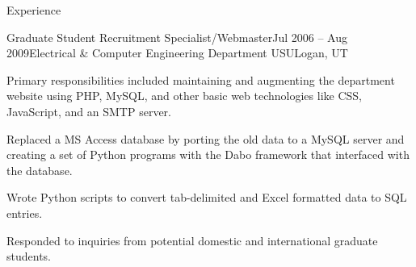 \documentclass{resume} %
\begin{document}
\begin{rSection}{Experience}
\begin{rSubsection}{Graduate Student Recruitment Specialist/Webmaster}{Jul 2006 -- Aug 2009}{Electrical \& Computer Engineering Department USU}{Logan, UT}
	\item Primary responsibilities included maintaining and augmenting the department website using PHP, MySQL, and other basic web technologies like CSS, JavaScript, and an SMTP server.
	
	\item Replaced a MS Access database by porting the old data to a MySQL server and creating a set of Python programs with the Dabo framework that interfaced with the database.
	
	\item Wrote Python scripts to convert tab-delimited and Excel formatted data to SQL entries.
	
	
	
	\item Responded to inquiries from potential domestic and international graduate students.

\end{rSubsection}


%
%

\end{rSection}

\end{document}
